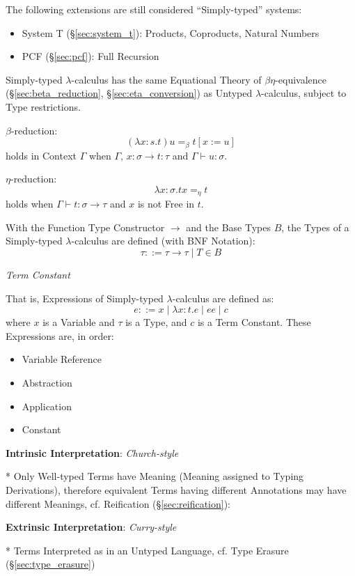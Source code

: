 The following extensions are still considered ``Simply-typed''
systems:
\begin{itemize}
  \item System T (\S\ref{sec:system_t}): Products, Coproducts, Natural
    Numbers
  \item PCF (\S\ref{sec:pcf}): Full Recursion
\end{itemize}

Simply-typed $\lambda$-calculus has the same Equational Theory of
$\beta\eta$-equivalence (\S\ref{sec:beta_reduction},
\S\ref{sec:eta_conversion}) as Untyped $\lambda$-calculus, subject to
Type restrictions.

$\beta$-reduction:
\[
  (\lambda x:s.t)u =_\beta t[x := u]
\]
holds in Context $\Gamma$ when $\Gamma$, $x:\sigma \rightarrow t:\tau$
and $\Gamma \vdash u:\sigma$.

$\eta$-reduction:
\[
  \lambda x:\sigma .t x =_\eta t
\]
holds when $\Gamma \vdash t : \sigma \rightarrow \tau$ and $x$ is not
Free in $t$.

With the Function Type Constructor $\rightarrow$ and the Base Types
$B$, the Types of a Simply-typed $\lambda$-calculus are defined (with
BNF Notation):
\[
  \tau ::= \tau \rightarrow \tau \;|\; T \in B
\]

\emph{Term Constant}

That is, Expressions of Simply-typed $\lambda$-calculus are defined
as:
\[
  e ::= x \;|\; \lambda x:t.e \;|\; e e \;|\; c
\]
where $x$ is a Variable and $\tau$ is a Type, and $c$ is a Term
Constant. These Expressions are, in order:
\begin{itemize}
  \item Variable Reference
  \item Abstraction
  \item Application
  \item Constant
\end{itemize}



\textbf{Intrinsic Interpretation}: \emph{Church-style}

* Only Well-typed Terms have Meaning (Meaning assigned to Typing
Derivations), therefore equivalent Terms having different Annotations
may have different Meanings, cf. Reification
(\S\ref{sec:reification}):



\textbf{Extrinsic Interpretation}: \emph{Curry-style}

* Terms Interpreted as in an Untyped Language, cf. Type Erasure
(\S\ref{sec:type_erasure})



